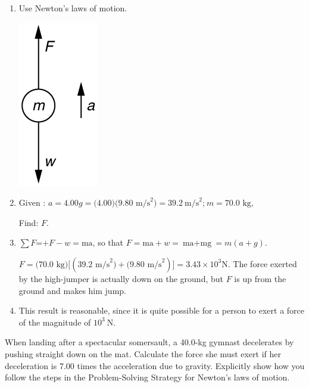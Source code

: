 \documentclass[
]{book}
\begin{document}
\hypertarget{fs-id1392214}{}
\begin{enumerate}
\def\labelenumi{\arabic{enumi}.}
\item
  Use Newton's laws of motion.

  \includegraphics{images/Figure_04_06_03.jpg}
\item
  Given :
  \({{a = 4.00}{g = (}4.00)(9.\text{80\ m/s}^{2}{) = \text{39.2}}\ \text{m/s}^{2}\text{;}\ }{}\)\({{m = \text{70}}\text{.}\text{0\ kg}}{}\),

  Find: \(F{}\).
\item
  \({\sum{F\text{=+}{{F - w} = \text{ma}}\text{,}}}{}\) so that
  \({{{{F = {\text{ma} + w}} = {\text{ma} + \text{mg}}} = m}({a + g})}{}\).

  \({{F = (}\text{70.0\ kg})\lbrack(\text{39}\text{.}\text{2\ m/s}^{2}{) + (}9\text{.}\text{80\ m/s}^{2})\rbrack}{}\)\({= {3.{\text{43} \times \text{10}^{3}}\text{N}}}{}\).
  The force exerted by the high-jumper is actually down on the ground,
  but \(F{}\) is up from the ground and makes him jump.
\item
  This result is reasonable, since it is quite possible for a person
  to exert a force of the magnitude of \({\text{10}^{3}\ \text{N}}{}\).
\end{enumerate}

\hypertarget{fs-id1682349}{}
\leavevmode{}%
When landing after a spectacular somersault, a 40.0-kg gymnast
decelerates by pushing straight down on the mat. Calculate the force she
must exert if her deceleration is 7.00 times the acceleration due to
gravity. Explicitly show how you follow the steps in the Problem-Solving
Strategy for Newton's laws of motion.
\end{document}

